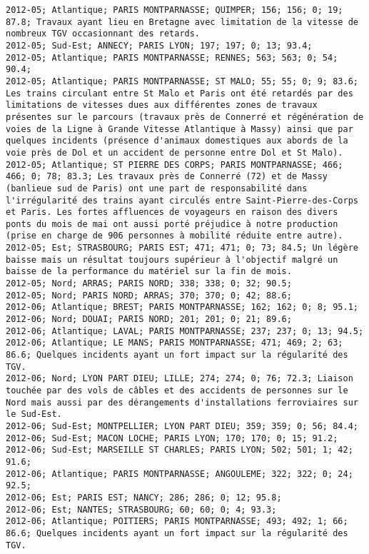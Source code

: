 \documentclass{article}
\begin{document}
\begin{Verbatim}[commandchars=\\\{\}]
2012-05; Atlantique; PARIS MONTPARNASSE; QUIMPER; 156; 156; 0; 19; 87.8; Travaux ayant lieu en Bretagne avec limitation de la vitesse de nombreux TGV occasionnant des retards.
2012-05; Sud-Est; ANNECY; PARIS LYON; 197; 197; 0; 13; 93.4; 
2012-05; Atlantique; PARIS MONTPARNASSE; RENNES; 563; 563; 0; 54; 90.4; 
2012-05; Atlantique; PARIS MONTPARNASSE; ST MALO; 55; 55; 0; 9; 83.6; Les trains circulant entre St Malo et Paris ont été retardés par des limitations de vitesses dues aux différentes zones de travaux présentes sur le parcours (travaux près de Connerré et régénération de voies de la Ligne à Grande Vitesse Atlantique à Massy) ainsi que par quelques incidents (présence d'animaux domestiques aux abords de la voie près de Dol et un accident de personne entre Dol et St Malo).
2012-05; Atlantique; ST PIERRE DES CORPS; PARIS MONTPARNASSE; 466; 466; 0; 78; 83.3; Les travaux près de Connerré (72) et de Massy (banlieue sud de Paris) ont une part de responsabilité dans l'irrégularité des trains ayant circulés entre Saint-Pierre-des-Corps et Paris. Les fortes affluences de voyageurs en raison des divers ponts du mois de mai ont aussi porté préjudice à notre production (prise en charge de 906 personnes à mobilité réduite entre autre).
2012-05; Est; STRASBOURG; PARIS EST; 471; 471; 0; 73; 84.5; Un légère baisse mais un résultat toujours supérieur à l'objectif malgré un baisse de la performance du matériel sur la fin de mois.
2012-05; Nord; ARRAS; PARIS NORD; 338; 338; 0; 32; 90.5; 
2012-05; Nord; PARIS NORD; ARRAS; 370; 370; 0; 42; 88.6; 
2012-06; Atlantique; BREST; PARIS MONTPARNASSE; 162; 162; 0; 8; 95.1; 
2012-06; Nord; DOUAI; PARIS NORD; 201; 201; 0; 21; 89.6; 
2012-06; Atlantique; LAVAL; PARIS MONTPARNASSE; 237; 237; 0; 13; 94.5; 
2012-06; Atlantique; LE MANS; PARIS MONTPARNASSE; 471; 469; 2; 63; 86.6; Quelques incidents ayant un fort impact sur la régularité des TGV.
2012-06; Nord; LYON PART DIEU; LILLE; 274; 274; 0; 76; 72.3; Liaison touchée par des vols de câbles et des accidents de personnes sur le Nord mais aussi par des dérangements d'installations ferroviaires sur le Sud-Est.
2012-06; Sud-Est; MONTPELLIER; LYON PART DIEU; 359; 359; 0; 56; 84.4; 
2012-06; Sud-Est; MACON LOCHE; PARIS LYON; 170; 170; 0; 15; 91.2; 
2012-06; Sud-Est; MARSEILLE ST CHARLES; PARIS LYON; 502; 501; 1; 42; 91.6; 
2012-06; Atlantique; PARIS MONTPARNASSE; ANGOULEME; 322; 322; 0; 24; 92.5; 
2012-06; Est; PARIS EST; NANCY; 286; 286; 0; 12; 95.8; 
2012-06; Est; NANTES; STRASBOURG; 60; 60; 0; 4; 93.3; 
2012-06; Atlantique; POITIERS; PARIS MONTPARNASSE; 493; 492; 1; 66; 86.6; Quelques incidents ayant un fort impact sur la régularité des TGV.

\end{Verbatim}
\end{document}
